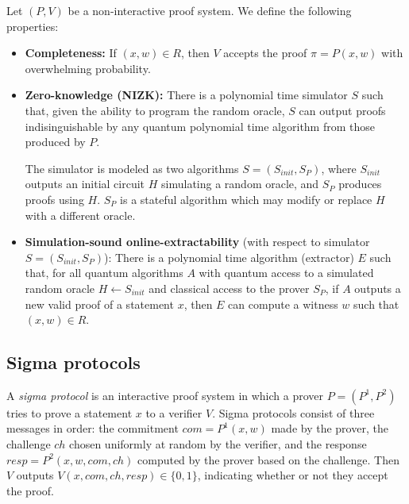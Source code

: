 \documentclass[runningheads,a4paper]{llncs}
\begin{document}
Let $(P,V)$ be a non-interactive proof system. We define the following properties:
\begin{itemize}
	\item 
	{\bf Completeness:} If $(x,w) \in R$, then $V$ accepts the proof $\pi = P(x,w)$ with overwhelming probability.

	\item
	{\bf Zero-knowledge (NIZK):} There is a polynomial time simulator $S$ such that, given the ability to program the random oracle, $S$ can output proofs indisinguishable by any quantum polynomial time algorithm from those produced by $P$. 

	The simulator is modeled as two algorithms $S = (S_{init}, S_P)$, where $S_{init}$ outputs an initial circuit $H$ simulating a random oracle, and $S_P$ produces proofs using $H$. $S_P$ is a stateful algorithm which may modify or replace $H$ with a different oracle.

	\item
	{\bf Simulation-sound online-extractability} (with respect to simulator $S = (S_{init}, S_P)$): There is a polynomial time algorithm (extractor) $E$ such that, for all quantum algorithms $A$ with quantum access to a simulated random oracle $H \leftarrow S_{init}$ and classical access to the prover $S_P$, if $A$ outputs a new valid proof of a statement $x$, then $E$ can compute a witness $w$ such that $(x,w) \in R$.
\end{itemize}



\subsection{Sigma protocols} 
A \emph{sigma protocol} is an interactive proof system in which a prover $P=(P^1,P^2)$ tries to prove a statement $x$ to a verifier $V$. Sigma protocols consist of three messages in order: the commitment $com = P^1(x,w)$ made by the prover, the challenge $ch$ chosen uniformly at random by the verifier, and the response $resp = P^2(x,w,com,ch)$ computed by the prover based on the challenge. Then $V$ outputs $V(x,com,ch,resp) \in \{0,1\}$, indicating whether or not they accept the proof.
\end{document}
